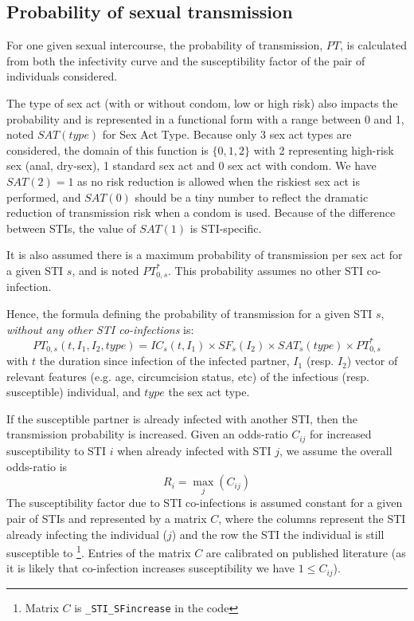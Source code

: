 \documentclass[11pt, onecolumn]{article}
\newcommand{\ttt}[1]{\texttt{#1}}
\begin{document}
\subsection{Probability of sexual transmission}

For one given sexual intercourse, the probability of transmission, $PT$, is calculated from both the infectivity curve and the susceptibility factor of the pair of individuals considered. 

The type of sex act (with or without condom, low or high risk) also impacts the probability and is represented in a functional form with a range between 0 and 1, noted $SAT(type)$ for Sex Act Type. Because only 3 sex act types are considered, the domain of this function is $\{0,1,2\}$ with 2 representing high-risk sex (anal, dry-sex), 1 standard sex act and 0 sex act with condom. We have $SAT(2)=1$ as no risk reduction is allowed when the riskiest sex act is performed, and $SAT(0)$ should be a tiny number to reflect the dramatic reduction of transmission risk when a condom is used. Because of the difference between STIs, the value of $SAT(1)$ is STI-specific.

It is also assumed there is a maximum probability of transmission per sex act for a given STI $s$, and is noted $PT_{0,s}^*$. This probability assumes no other STI co-infection. 

Hence, the formula defining the probability of transmission for a given STI $s$, \emph{without any other STI co-infections} is:
$$PT_{0,s}(t,I_1,I_2,type) =  IC_s(t,I_1)\times SF_s(I_2) \times SAT_s(type) \times PT_{0,s}^* $$
with $t$ the duration since infection of the infected partner, $I_1$ (resp. $I_2$) vector of relevant features (e.g. age, circumcision status, etc) of the infectious (resp. susceptible) individual, and $type$ the sex act type.

If the susceptible partner is already infected with another STI, then the transmission probability is increased. Given an odds-ratio $C_{ij}$ for increased susceptibility to STI $i$ when already infected with STI $j$, we assume the overall odds-ratio is
$$R_i = \max_j(C_{ij})$$
The susceptibility factor due to STI co-infections is assumed constant for a given pair of STIs and represented by a matrix $C$, where the columns represent the STI already infecting the individual ($j$) and the row the STI the individual is still susceptible to
\footnote{Matrix $C$ is \ttt{\_STI\_SFincrease} in the code}. 
Entries of the matrix $C$ are calibrated on published literature (as it is likely that co-infection increases susceptibility we have $1\leq C_{ij}$). 
\end{document}
